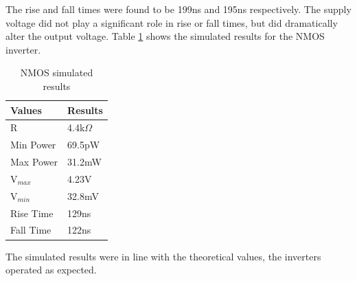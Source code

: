 The rise and fall times were found to be 199ns and 195ns respectively. The supply voltage did not play a significant role in rise or fall times, but did dramatically alter the output voltage. Table \ref{tab:NMOS} shows the simulated results for the NMOS inverter.



\begin{table}[H]
\centering
\caption{NMOS simulated results}
\label{tab:NMOS}
\begin{tabular}{|l|l|}
\hline
Values    & Results      \\ \hline
R         & 4.4k$\Omega$ \\ \hline
Min Power & 69.5pW       \\ \hline
Max Power & 31.2mW       \\ \hline
V$_{max}$ & 4.23V        \\ \hline
V$_{min}$ & 32.8mV       \\ \hline
Rise Time & 129ns        \\ \hline
Fall Time & 122ns        \\ \hline
\end{tabular}
\end{table}

The simulated results were in line with the theoretical values, the inverters operated as expected.










